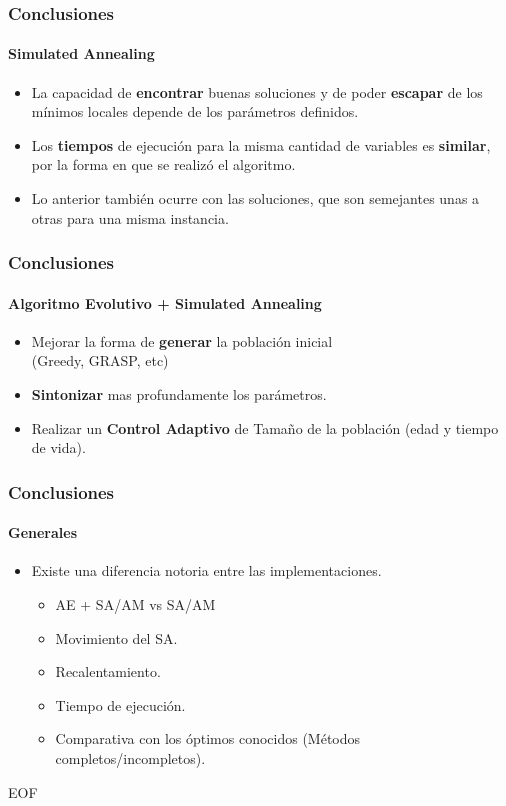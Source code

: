 \frame
{
\frametitle{Conclusiones}
\framesubtitle{Simulated Annealing}
\begin{itemize}
	\item La capacidad de {\bf encontrar} buenas soluciones y de poder {\bf escapar} de los mínimos locales depende de los parámetros definidos.
	\item Los {\bf tiempos} de ejecución para la misma cantidad de variables es {\bf similar}, por la forma en que se realizó el algoritmo. 
	\item Lo anterior también ocurre con las soluciones, que son semejantes unas a otras para una misma instancia.
\end{itemize}

}
\frame
{
\frametitle{Conclusiones}
\framesubtitle{Algoritmo Evolutivo + Simulated Annealing}
\begin{itemize}
	\item Mejorar la forma de {\bf generar} la población inicial\\ (Greedy, GRASP, etc)
	\item {\bf Sintonizar} mas profundamente los parámetros.
	\item Realizar un {\bf Control Adaptivo} de Tamaño de la población (edad y tiempo de vida).
\end{itemize}
}
\frame
{
\frametitle{Conclusiones}
\framesubtitle{Generales}
\begin{itemize}
	\item Existe una diferencia notoria entre las implementaciones.
	 \begin{itemize}
	 	\item AE + SA/AM vs SA/AM
		\item Movimiento del SA.
		\item Recalentamiento.
		\item Tiempo de ejecución.
	\item Comparativa con los óptimos conocidos (Métodos completos/incompletos).
	 \end{itemize}
\end{itemize}
}

\frame
{
\begin{center}
	\vspace{1.5cm}
	\Huge EOF
\end{center}
}
